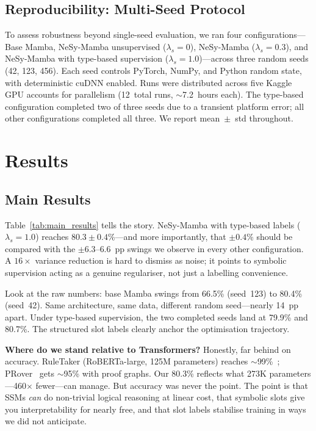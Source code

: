 \documentclass[conference]{IEEEtran}
\DeclareRobustCommand{\model}{NeSy-Mamba}
\begin{document}
\subsection{Reproducibility: Multi-Seed Protocol}
\label{sec:multiseed}

To assess robustness beyond single-seed evaluation, we ran
four configurations---Base Mamba, \model{} unsupervised
($\lambda_s{=}0$), \model{} ($\lambda_s{=}0.3$), and \model{}
with type-based supervision ($\lambda_s{=}1.0$)---across three
random seeds (42, 123, 456). Each seed controls PyTorch, NumPy,
and Python random state, with deterministic cuDNN enabled.
Runs were distributed across five Kaggle GPU accounts for
parallelism (12~total runs, {$\sim$}7.2~hours each). The
type-based configuration completed two of three seeds due to a
transient platform error; all other configurations completed
all three. We report mean~$\pm$~std throughout.


\section{Results}
\label{sec:results}

\subsection{Main Results}

Table~\ref{tab:main_results} tells the story. \model{} with
type-based labels ($\lambda_s{=}1.0$) reaches $80.3 \pm 0.4\%$---and
more importantly, that $\pm 0.4\%$ should be compared with the
$\pm 6.3$--$6.6$~pp swings we observe in every other configuration.
A $16\times$ variance reduction is hard to dismiss as noise; it
points to symbolic supervision acting as a genuine regulariser,
not just a labelling convenience.

Look at the raw numbers: base Mamba swings from 66.5\% (seed~123)
to 80.4\% (seed~42). Same architecture, same data, different
random seed---nearly 14~pp apart.  Under type-based supervision,
the two completed seeds land at 79.9\% and 80.7\%.  The structured
slot labels clearly anchor the optimisation trajectory.

\textbf{Where do we stand relative to Transformers?}
Honestly, far behind on accuracy.  RuleTaker (RoBERTa-large, 125M
parameters) reaches $\sim$99\%~\cite{clark2020ruletaker};
PRover~\cite{saha2020prover} gets $\sim$95\% with proof graphs.
Our 80.3\% reflects what 273K parameters---460$\times$ fewer---can
manage.  But accuracy was never the point.  The point is that SSMs
\emph{can} do non-trivial logical reasoning at linear cost, that
symbolic slots give you interpretability for nearly free, and that
slot labels stabilise training in ways we did not anticipate.
\end{document}

